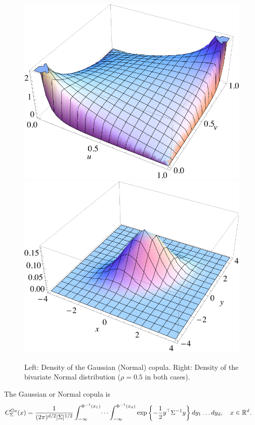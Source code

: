 \begin{figure}[t]
  \centering
  \includegraphics[scale=.35]{_pics/copulas/normal1.pdf}  
  \includegraphics[scale=.35]{_pics/copulas/normal2.pdf}  
  \caption{Left: Density of the Gaussian (Normal) copula. Right:
    Density of the bivariate Normal distribution ($\rho=0.5$ in both
    cases).} 
  \label{fig:normalcopula}
\end{figure}

The Gaussian or Normal copula is
\begin{align}
    C^{Ga}_\Sigma(x) &= \frac{1}{(2\pi)^{d/2} |\Sigma|^{1/2}}
    \int_{-\infty}^{\Phi^{-1}(x_1)} \dots \int_{-\infty}^{\Phi^{-1}(x_d)}
    \exp \left\{
    -\frac{1}{2}y^\top \Sigma^{-1}y
    \right\}
    dy_1 \dots dy_d, \quad x\in {\mathbb{R}}^d.
    \end{align}

